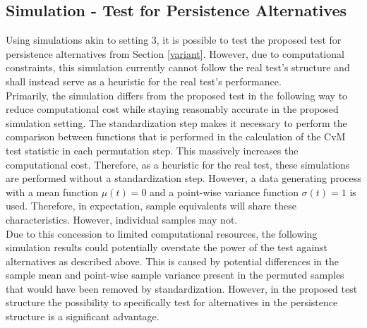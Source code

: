 \documentclass[12pt, a4paper]{article}
\theoremstyle{MAstyle} \newtheorem{assumption}{Assumption}[section]
\theoremstyle{MAstyle} \newtheorem{definition}{Definition}[section]
\theoremstyle{MAstyle} \newtheorem{theorem}{Theorem}[section]
\begin{document}
		\subsection{Simulation - Test for Persistence Alternatives}\label{sim_persistence}
		Using simulations akin to setting 3, it is possible to test the proposed test for persistence alternatives from Section \ref{variant}. However, due to computational constraints, this simulation currently cannot follow the real test's structure and shall instead serve as a heuristic for the real test's performance. \\
		Primarily, the simulation differs from the proposed test in the following way to reduce computational cost while staying reasonably accurate in the proposed simulation setting. The standardization step makes it necessary to perform the comparison between functions that is performed in the calculation of the CvM test statistic in each permutation step. This massively increases the computational cost. Therefore, as a heuristic for the real test, these simulations are performed without a standardization step. However, a data generating process with a mean function $\mu(t) = 0$ and a point-wise variance function $\sigma(t) = 1$ is used. Therefore, in expectation, sample equivalents will share these characteristics. However, individual samples may not. \\
		Due to this concession to limited computational resources, the following simulation results could potentially overstate the power of the test against alternatives as described above. This is caused by potential differences in the sample mean and point-wise sample variance present in the permuted samples that would have been removed by standardization. 
		However, in the proposed test structure the possibility to specifically test for alternatives in the persistence structure is a significant advantage.\\
	
\end{document}
